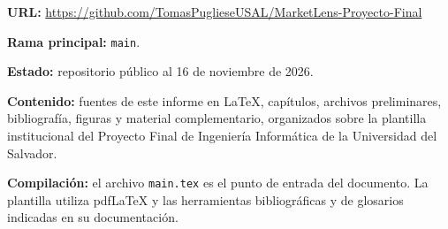 \noindent\textbf{URL:}
\url{https://github.com/TomasPuglieseUSAL/MarketLens-Proyecto-Final}

\noindent\textbf{Rama principal:} \texttt{main}.

\noindent\textbf{Estado:} repositorio público al
16 de noviembre de 2026.

\noindent\textbf{Contenido:} fuentes de este informe en
\LaTeX, capítulos, archivos preliminares, bibliografía,
figuras y material complementario, organizados sobre
la plantilla institucional del Proyecto Final de Ingeniería
Informática de la Universidad del Salvador.

\noindent\textbf{Compilación:} el archivo \texttt{main.tex}
es el punto de entrada del documento. La plantilla utiliza
pdfLaTeX y las herramientas bibliográficas y de glosarios
indicadas en su documentación.

